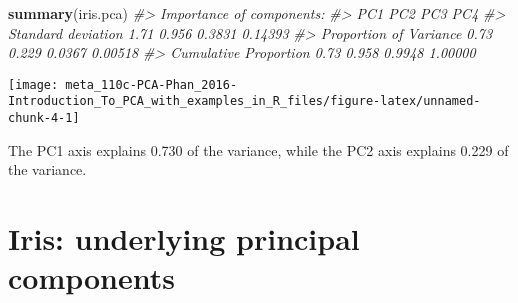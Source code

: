\documentclass[]{book}
\newenvironment{Shaded}{\begin{snugshade}}{\end{snugshade}}
\newcommand{\CommentTok}[1]{\textcolor[rgb]{0.56,0.35,0.01}{\textit{#1}}}
\newcommand{\DataTypeTok}[1]{\textcolor[rgb]{0.13,0.29,0.53}{#1}}
\newcommand{\DecValTok}[1]{\textcolor[rgb]{0.00,0.00,0.81}{#1}}
\newcommand{\KeywordTok}[1]{\textcolor[rgb]{0.13,0.29,0.53}{\textbf{#1}}}
\newcommand{\NormalTok}[1]{#1}
\newcommand{\OperatorTok}[1]{\textcolor[rgb]{0.81,0.36,0.00}{\textbf{#1}}}
\newcommand{\OtherTok}[1]{\textcolor[rgb]{0.56,0.35,0.01}{#1}}
\newcommand{\StringTok}[1]{\textcolor[rgb]{0.31,0.60,0.02}{#1}}
\begin{document}
\begin{Shaded}
\begin{Highlighting}[]
\KeywordTok{summary}\NormalTok{(iris.pca)}
\CommentTok{#> Importance of components:}
\CommentTok{#>                         PC1   PC2    PC3     PC4}
\CommentTok{#> Standard deviation     1.71 0.956 0.3831 0.14393}
\CommentTok{#> Proportion of Variance 0.73 0.229 0.0367 0.00518}
\CommentTok{#> Cumulative Proportion  0.73 0.958 0.9948 1.00000}
\end{Highlighting}
\end{Shaded}

\begin{Shaded}
\end{Shaded}

\begin{center}\texttt{[image: meta\_110c-PCA-Phan\_2016-Introduction\_To\_PCA\_with\_examples\_in\_R\_files/figure-latex/unnamed-chunk-4-1]} \end{center}

The PC1 axis explains 0.730 of the variance, while the PC2 axis explains
0.229 of the variance.

\hypertarget{iris-underlying-principal-components}{%
\section{Iris: underlying principal components}\label{iris-underlying-principal-components}}
\end{document}
